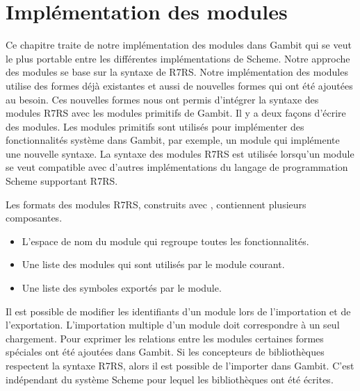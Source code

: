 
\chapter{Implémentation des modules}
\label{ch:modules_implementation}

Ce chapitre traite de notre implémentation des modules dans Gambit qui se veut
le plus portable entre les différentes implémentations de Scheme.  Notre
approche des modules se base sur la syntaxe de R7RS.  Notre implémentation des
modules utilise des formes déjà existantes et aussi de nouvelles formes qui ont
été ajoutées au besoin.  Ces nouvelles formes nous ont permis d'intégrer la
syntaxe des modules R7RS avec les modules primitifs de Gambit. Il y a deux
façons d'écrire des modules.  Les modules primitifs sont utilisés pour
implémenter des fonctionnalités système dans Gambit, par exemple, un module qui
implémente une nouvelle syntaxe.  La syntaxe des modules R7RS est utilisée
lorsqu'un module se veut compatible avec d'autres implémentations du langage de
programmation Scheme supportant R7RS.


Les formats des modules R7RS, construits avec , contiennent
plusieurs composantes.
\begin{itemize}
  \item L'espace de nom du module qui regroupe toutes les fonctionnalités.
  \item Une liste des modules qui sont utilisés par le module courant.
  \item Une liste des symboles exportés par le module.
\end{itemize}
Il est possible de modifier les identifiants d'un module lors de l'importation et de l'exportation.
L'importation multiple d'un module doit correspondre à un seul chargement.
Pour exprimer les relations entre les modules certaines formes spéciales
ont été ajoutées dans Gambit.  Si les concepteurs de bibliothèques respectent
la syntaxe R7RS, alors il est possible de l'importer dans Gambit. C'est indépendant
du système Scheme pour lequel les bibliothèques ont été écrites.




